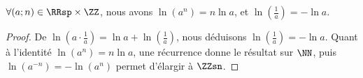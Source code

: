 

\begin{fact} \label{ln-id}
    $\forall (a;n) \in \RRsp \times \ZZ$,
    nous avons
    $\ln(a^n) = n \ln a$,
    et
    $\ln(\frac1a) = - \ln a$.
\end{fact}


\begin{proof}
    De $\ln(a \cdot \frac1a) = \ln a + \ln(\frac1a)$, nous déduisons $\ln(\frac1a) = - \ln a$.
    Quant à l'identité $\ln(a^n) = n \ln a$, une récurrence donne le résultat sur $\NN$, puis $\ln(a^{-n}) = -\ln(a^n)$ permet d'élargir à $\ZZsn$.
\end{proof}
